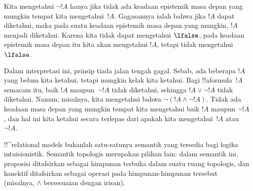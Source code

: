 \documentclass[../../../include/open-logic-section]{subfiles}
\begin{document}
Kita mengetahui $\lnot !A$ hanya jika tidak ada keadaan epistemik masa depan
yang mungkin tempat kita mengetahui~$!A$. Gagasannya ialah bahwa jika $!A$
dapat diketahui, maka pada suatu keadaan epistemik masa depan yang mungkin,
$!A$ menjadi diketahui. Karena kita tidak dapat mengetahui $\lfalse$, pada
keadaan epistemik masa depan itu kita akan mengetahui $!A$, tetapi tidak
mengetahui~$\lfalse$.

Dalam interpretasi ini, prinsip tiada jalan tengah gagal. Sebab, ada beberapa
$!A$ yang belum kita ketahui, tetapi mungkin kelak kita ketahui. Bagi
!!a{formula}~$!A$ semacam itu, baik $!A$ maupun~$\lnot !A$ tidak diketahui,
sehingga $!A \lor \lnot !A$ tidak diketahui. Namun, misalnya, kita mengetahui
bahwa $\lnot(!A \land \lnot !A)$. Tidak ada keadaan masa depan yang mungkin
tempat kita mengetahui baik $!A$ maupun $\lnot !A$, dan hal ini kita ketahui
secara terlepas dari apakah kita mengetahui~$!A$ atau $\lnot !A$.

!!^{relational model}s bukanlah satu-satunya semantik yang tersedia bagi
logika intuisionistik. Semantik topologis merupakan pilihan lain: dalam
semantik ini, proposisi ditafsirkan sebagai himpunan terbuka dalam suatu ruang
topologis, dan konektif ditafsirkan sebagai operasi pada himpunan-himpunan
tersebut (misalnya, $\land$ bersesuaian dengan irisan).
\end{document}
